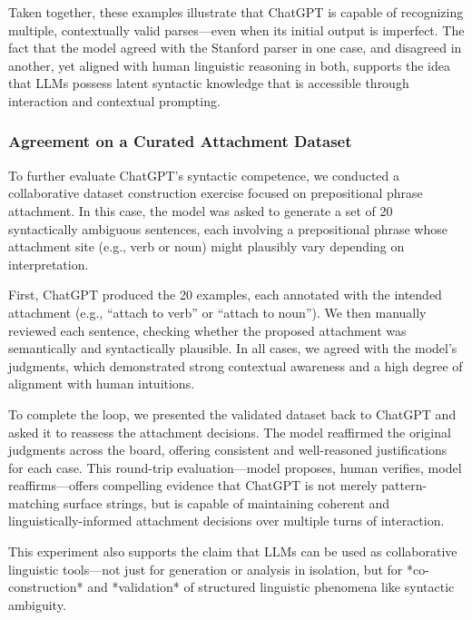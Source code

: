 Taken together, these examples illustrate that ChatGPT is capable of recognizing multiple, contextually valid parses—even when its initial output is imperfect. The fact that the model agreed with the Stanford parser in one case, and disagreed in another, yet aligned with human linguistic reasoning in both, supports the idea that LLMs possess latent syntactic knowledge that is accessible through interaction and contextual prompting.

\subsubsection{Agreement on a Curated Attachment Dataset}

To further evaluate ChatGPT’s syntactic competence, we conducted a collaborative dataset construction exercise focused on prepositional phrase attachment. In this case, the model was asked to generate a set of 20 syntactically ambiguous sentences, each involving a prepositional phrase whose attachment site (e.g., verb or noun) might plausibly vary depending on interpretation.

First, ChatGPT produced the 20 examples, each annotated with the intended attachment (e.g., “attach to verb” or “attach to noun”). We then manually reviewed each sentence, checking whether the proposed attachment was semantically and syntactically plausible. In all cases, we agreed with the model’s judgments, which demonstrated strong contextual awareness and a high degree of alignment with human intuitions.

To complete the loop, we presented the validated dataset back to ChatGPT and asked it to reassess the attachment decisions. The model reaffirmed the original judgments across the board, offering consistent and well-reasoned justifications for each case. This round-trip evaluation—model proposes, human verifies, model reaffirms—offers compelling evidence that ChatGPT is not merely pattern-matching surface strings, but is capable of maintaining coherent and linguistically-informed attachment decisions over multiple turns of interaction.

This experiment also supports the claim that LLMs can be used as collaborative linguistic tools—not just for generation or analysis in isolation, but for *co-construction* and *validation* of structured linguistic phenomena like syntactic ambiguity.
